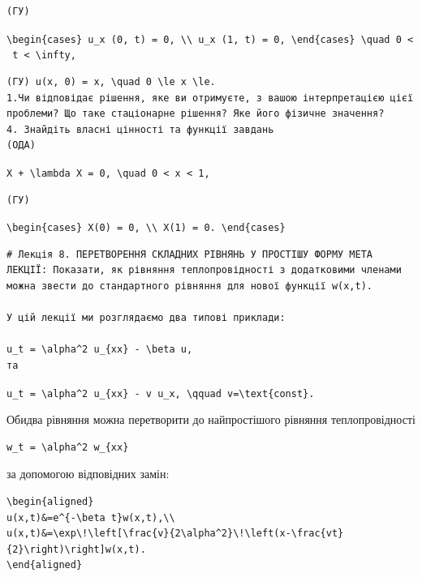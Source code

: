 \documentclass[
  ukrainian,
]{article}
\begin{document}
\begin{verbatim}
(ГУ)
\end{verbatim}

\texttt{\textbackslash{}begin\{cases\}\ u\_x\ (0,\ t)\ =\ 0,\ \textbackslash{}\textbackslash{}\ u\_x\ (1,\ t)\ =\ 0,\ \textbackslash{}end\{cases\}\ \textbackslash{}quad\ 0\ \textless{}\ t\ \textless{}\ \textbackslash{}infty,}

\begin{verbatim}
(ГУ) u(x, 0) = x, \quad 0 \le x \le. 
1.Чи відповідає рішення, яке ви отримуєте, з вашою інтерпретацією цієї проблеми? Що таке стаціонарне рішення? Яке його фізичне значення?
4. Знайдіть власні цінності та функції завдань
(ОДА)
\end{verbatim}

\texttt{X\textquotesingle{}\textquotesingle{}\ +\ \textbackslash{}lambda\ X\ =\ 0,\ \textbackslash{}quad\ 0\ \textless{}\ x\ \textless{}\ 1,}

\begin{verbatim}
(ГУ)
\end{verbatim}

\texttt{\textbackslash{}begin\{cases\}\ X\textquotesingle{}(0)\ =\ 0,\ \textbackslash{}\textbackslash{}\ X\textquotesingle{}(1)\ =\ 0.\ \textbackslash{}end\{cases\}}

\begin{verbatim}
# Лекція 8. ПЕРЕТВОРЕННЯ СКЛАДНИХ РІВНЯНЬ У ПРОСТІШУ ФОРМУ МЕТА ЛЕКЦІЇ: Показати, як рівняння теплопровідності з додатковими членами можна звести до стандартного рівняння для нової функції w(x,t).

У цій лекції ми розглядаємо два типові приклади:

u_t = \alpha^2 u_{xx} - \beta u,
та
\end{verbatim}

\texttt{u\_t\ =\ \textbackslash{}alpha\^{}2\ u\_\{xx\}\ -\ v\ u\_x,\ \textbackslash{}qquad\ v=\textbackslash{}text\{const\}.}

Обидва рівняння можна перетворити до найпростішого рівняння
теплопровідності

\begin{verbatim}
w_t = \alpha^2 w_{xx}
\end{verbatim}

за допомогою відповідних замін:

\begin{verbatim}
\begin{aligned}
u(x,t)&=e^{-\beta t}w(x,t),\\
u(x,t)&=\exp\!\left[\frac{v}{2\alpha^2}\!\left(x-\frac{vt}{2}\right)\right]w(x,t).
\end{aligned}
\end{verbatim}
\end{document}
